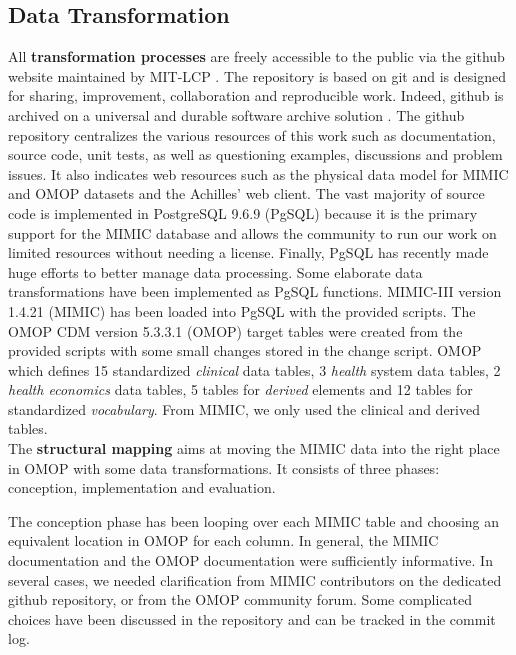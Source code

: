 %
%
\subsection{Data Transformation}

%

All \textbf{transformation processes} are freely accessible to the public via
the github website \cite{mimic-omop-website} maintained by MIT-LCP
\cite{mimic-nature}. The repository is based on git and is designed for
sharing, improvement, collaboration and reproducible work. Indeed, github is
archived on a universal and durable software archive solution
\cite{universal-archive}. The github repository centralizes the various
resources of this work such as documentation, source code, unit tests, as well
as questioning examples, discussions and problem issues.  It also indicates web
resources such as the physical data model for MIMIC \cite{mimic-schemaspy} and
OMOP\cite{omop-schemaspy} datasets and the Achilles' web
client\cite{mimic-omop-achilles}.
The vast majority of source code is implemented in PostgreSQL 9.6.9 (PgSQL) 
because it is the primary support for the MIMIC database and allows the community 
to run our work on limited resources without needing a license. 
Finally, PgSQL has recently made huge efforts to better manage data processing. 
Some elaborate data transformations have been implemented as PgSQL functions.
MIMIC-III version 1.4.21 (MIMIC) has been loaded into PgSQL with the provided
scripts. The OMOP CDM version 5.3.3.1 (OMOP) target tables were created from
the provided scripts with some small changes stored in the change script. OMOP
which defines 15 standardized \textit{clinical} data tables, 3 \textit{health}
system data tables, 2 \textit{health economics} data tables, 5 tables for
\textit{derived} elements and 12 tables for standardized \textit{vocabulary}.
From MIMIC, we only used the clinical and derived tables. 
\\

The \textbf{structural mapping} aims at moving the MIMIC data into the right
place in OMOP with some data transformations. It consists of three
phases: conception, implementation and evaluation.

The conception phase has been looping over each MIMIC table and choosing an
equivalent location in OMOP for each column. In general, the MIMIC
documentation and the OMOP documentation were sufficiently informative. In
several cases, we needed clarification from MIMIC contributors on the dedicated
github repository, or from the OMOP community forum. Some complicated choices
have been discussed in the repository \cite{mimic-omop-github} and can be
tracked in the commit log.


